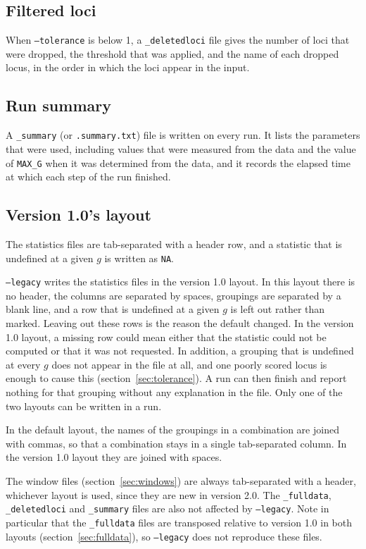 \documentclass[11pt]{article}
\newcommand{\flag}[1]{\texttt{#1}}
\begin{document}
\subsection{Filtered loci}
\label{sec:deletedloci}

When \flag{--tolerance} is below 1, a \texttt{\_deletedloci} file gives the
number of loci that were dropped, the threshold that was applied, and the name
of each dropped locus, in the order in which the loci appear in the input.

\subsection{Run summary}

A \texttt{\_summary} (or \texttt{.summary.txt}) file is written on every run.
It lists the parameters that were used, including values that were measured
from the data and the value of \texttt{MAX\_G} when it was determined from the
data, and it records the elapsed time at which each step of the run finished.

\subsection{Version 1.0's layout}
\label{sec:legacy}

The statistics files are tab-separated with a header row, and a statistic
that is undefined at a given $g$ is written as \texttt{NA}.

\flag{--legacy} writes the statistics files in the version 1.0 layout. In this
layout there is no header, the columns are separated by spaces, groupings are
separated by a blank line, and a row that is undefined at a given $g$ is left
out rather than marked. Leaving out these rows is the reason the default
changed. In the version 1.0 layout, a missing row could mean either that the
statistic could not be computed or that it was not requested. In addition, a
grouping that is undefined at every $g$ does not appear in the file at all,
and one poorly scored locus is enough to cause this
(section~\ref{sec:tolerance}). A run can then finish and report nothing for
that grouping without any explanation in the file. Only one of the two layouts
can be written in a run.

In the default layout, the names of the groupings in a combination are joined
with commas, so that a combination stays in a single tab-separated column. In
the version 1.0 layout they are joined with spaces.

The window files (section~\ref{sec:windows}) are always tab-separated with a
header, whichever layout is used, since they are new in version 2.0. The
\texttt{\_fulldata}, \texttt{\_deletedloci} and \texttt{\_summary} files are
also not affected by \flag{--legacy}. Note in particular that the
\texttt{\_fulldata} files are transposed relative to version 1.0 in both
layouts (section~\ref{sec:fulldata}), so \flag{--legacy} does not reproduce
these files.
\end{document}
